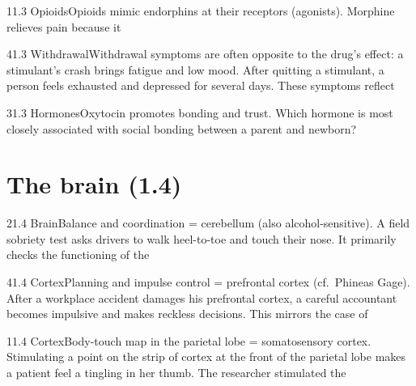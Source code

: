 \documentclass[11pt]{article}
\begin{document}
\begin{q}{1}{1.3 Opioids}{Opioids mimic endorphins at their receptors (agonists).}
Morphine relieves pain because it
\end{q}

\begin{q}{4}{1.3 Withdrawal}{Withdrawal symptoms are often opposite to the drug's effect: a stimulant's crash brings fatigue and low mood.}
After quitting a stimulant, a person feels exhausted and depressed for several days. These symptoms reflect
\end{q}

\begin{q}{3}{1.3 Hormones}{Oxytocin promotes bonding and trust.}
Which hormone is most closely associated with social bonding between a parent and newborn?
\end{q}

\section{The brain (1.4)}

\begin{q}{2}{1.4 Brain}{Balance and coordination = cerebellum (also alcohol-sensitive).}
A field sobriety test asks drivers to walk heel-to-toe and touch their nose. It primarily checks the functioning of the
\end{q}

\begin{q}{4}{1.4 Cortex}{Planning and impulse control = prefrontal cortex (cf.\ Phineas Gage).}
After a workplace accident damages his prefrontal cortex, a careful accountant becomes impulsive and makes reckless decisions. This mirrors the case of
\end{q}

\begin{q}{1}{1.4 Cortex}{Body-touch map in the parietal lobe = somatosensory cortex.}
Stimulating a point on the strip of cortex at the front of the parietal lobe makes a patient feel a tingling in her thumb. The researcher stimulated the
\end{q}
\end{document}
